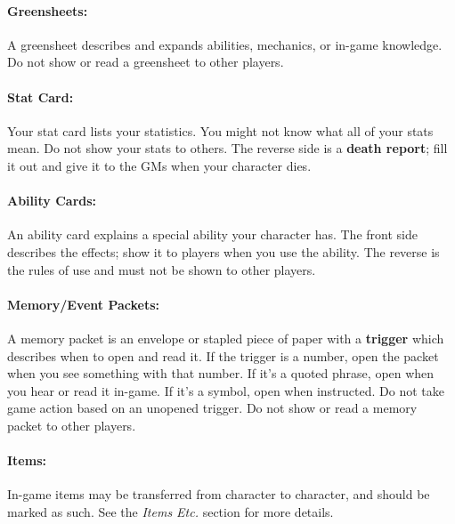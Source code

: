 \documentclass[sheet]{airship}
\begin{document}

\paragraph{Greensheets:} A greensheet describes and expands abilities,
mechanics, or in-game knowledge.  Do not show or read a greensheet to
other players.

\paragraph{Stat Card:} Your stat card lists your statistics.  You
might not know what all of your stats mean.  Do not show your stats to
others.  The reverse side is a {\bf death report}; fill it out and
give it to the GMs when your character dies.

\paragraph{Ability Cards:} An ability card explains a special ability
your character has.  The front side describes the effects; show it to
players when you use the ability.  The reverse is the rules of use and
must not be shown to other players.

\paragraph{Memory/Event Packets:} A memory packet is an envelope or
stapled piece of paper with a {\bf trigger} which describes when to
open and read it.  If the trigger is a number, open the packet when
you see something with that number.  If it's a quoted phrase, open
when you hear or read it in-game.  If it's a symbol, open when
instructed.  Do not take game action based on an unopened trigger.  Do
not show or read a memory packet to other players.

\paragraph{Items:} In-game items may be transferred from character to
character, and should be marked as such.  See the {\em Items Etc.}
section for more details.
\end{document}
